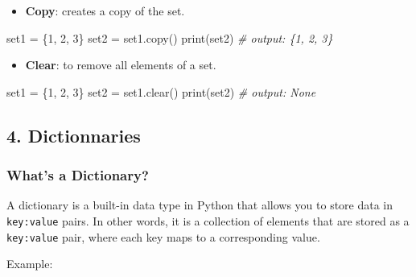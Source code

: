 \documentclass[11pt]{article}
\providecommand{\tightlist}{%
      \setlength{\itemsep}{0pt}\setlength{\parskip}{0pt}}
\newenvironment{Shaded}{}{}
\newcommand{\DecValTok}[1]{\textcolor[rgb]{0.25,0.63,0.44}{{#1}}}
\newcommand{\CommentTok}[1]{\textcolor[rgb]{0.38,0.63,0.69}{\textit{{#1}}}}
\newcommand{\NormalTok}[1]{{#1}}
\newcommand{\OperatorTok}[1]{\textcolor[rgb]{0.40,0.40,0.40}{{#1}}}
\newcommand{\BuiltInTok}[1]{{#1}}
\begin{document}
\begin{itemize}
\tightlist
\item
  \textbf{Copy}: creates a copy of the set.
\end{itemize}

\begin{Shaded}
\begin{Highlighting}[]
\NormalTok{set1 }\OperatorTok{=}\NormalTok{ \{}\DecValTok{1}\NormalTok{, }\DecValTok{2}\NormalTok{, }\DecValTok{3}\NormalTok{\}}
\NormalTok{set2 }\OperatorTok{=}\NormalTok{ set1.copy()}
\BuiltInTok{print}\NormalTok{(set2) }\CommentTok{\# output: \{1, 2, 3\}}
\end{Highlighting}
\end{Shaded}

\begin{itemize}
\tightlist
\item
  \textbf{Clear}: to remove all elements of a set.
\end{itemize}

\begin{Shaded}
\begin{Highlighting}[]
\NormalTok{set1 }\OperatorTok{=}\NormalTok{ \{}\DecValTok{1}\NormalTok{, }\DecValTok{2}\NormalTok{, }\DecValTok{3}\NormalTok{\}}
\NormalTok{set2 }\OperatorTok{=}\NormalTok{ set1.clear()}
\BuiltInTok{print}\NormalTok{(set2) }\CommentTok{\# output: None}
\end{Highlighting}
\end{Shaded}

\hypertarget{dictionnaries}{%
\subsection{4. Dictionnaries}\label{dictionnaries}}

\hypertarget{whats-a-dictionary}{%
\subsubsection{What's a Dictionary?}\label{whats-a-dictionary}}

A dictionary is a built-in data type in Python that allows you to store
data in \texttt{key:value} pairs. In other words, it is a collection of
elements that are stored as a \texttt{key:value} pair, where each key
maps to a corresponding value.

Example:
\end{document}
